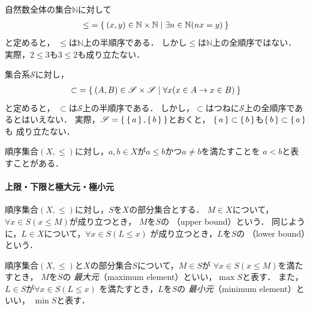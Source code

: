    \begin{ex} \label{ex:orderedset2}
     自然数全体の集合$\mathbb{N}$に対して
     \begin{align*}
       {\leq} = \Set{ (x,y) \in \mathbb{N} \times \mathbb{N} \mid 
       \exists n \in \mathbb{N} (nx = y )}
     \end{align*}  
     と定めると，
     $\leq$は$\mathbb{N}$上の半順序である．
     しかし$\leq$は$\mathbb{N}$上の全順序ではない．
     実際，$2 \leq 3$も$3 \leq 2$も成り立たない．
   \end{ex}

   \begin{ex} \label{ex:orderedset3}
     集合系$\mathscr{S}$に対し，
     \begin{align*}
       {\subset} = \Set{ ( A,B ) \in \mathscr{S} \times \mathscr{S} \mid 
       \forall x ( x \in A \to x \in B )}
     \end{align*}  
     と定めると，
     $\subset$は$\mathscr{S}$上の半順序である．
     しかし，$\subset$はつねに$\mathscr{S}$上の全順序であるとはいえない．
     実際，$\mathscr{S} = \Set{ \set{a} , \set{b}}$とおくと，
     $\set{a} \subset \set{b}$も$\set{b} \subset \set{a}$も
     成り立たない．
   \end{ex}

   順序集合$(X, {\leq})$に対し，$a,b \in X$が$a \leq b$かつ$a \neq b$を満たすことを
   $a < b$と表すことがある．

  \paragraph{上限・下限と極大元・極小元}
   順序集合$(X, {\leq})$に対し，$S$を$X$の部分集合とする．
   $M \in X$について，$\forall x \in S( x \leq M)$が成り立つとき，
   $M$を$S$の
   \emph{}（upper bound）という．
   同じように，$L \in X$について，$\forall x \in S (L \leq x)$
   が成り立つとき，$L$を$S$の
   \emph{}（lower bound）という．
   
   順序集合$(X, {\leq})$と$X$の部分集合$S$について，$M \in S$が
   $\forall x \in S ( x \leq M)$を満たすとき，
   $M$を$S$の
   \emph{最大元}（maximum element）といい，$\max S$と表す．
   また，$L \in S$が$\forall x \in S ( L \leq x)$
   を満たすとき，$L$を$S$の
   \emph{最小元}（minimum element）といい，
   $\min S$と表す．

